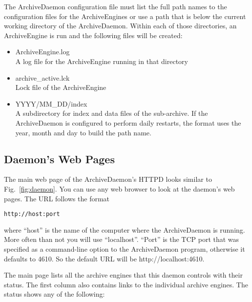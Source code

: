 \noindent The ArchiveDaemon configuration file must list the full path
names to the configuration files for the ArchiveEngines or use a path
that is below the current working directory of the ArchiveDaemon.
Within each of those directories, an ArchiveEngine is run and the
following files will be created:
\begin{itemize}
\item ArchiveEngine.log\\
  A log file for the ArchiveEngine running in that directory
\item archive\_active.lck\\
  Lock file of the ArchiveEngine
\item YYYY/MM\_DD/index \\
  A subdirectory for index and data files of the sub-archive.  If the
  ArchiveDaemon is configured to perform daily restarts, the format
  uses the year, month and day to build the path name.
\end{itemize}

\subsection{Daemon's Web Pages}
The main web page of the ArchiveDaemon's HTTPD looks similar to
Fig.~\ref{fig:daemon}. You can use any web browser to look at the
daemon's web pages. The URL follows the format
\begin{lstlisting}[keywordstyle=\sffamily]
    http://host:port
\end{lstlisting}
\noindent where ``host'' is the name of the computer where the
ArchiveDaemon is running. More often than not you will use
``localhost''. ``Port'' is the TCP port that was specified as a
command-line option to the ArchiveDaemon program, otherwise it
defaults to 4610. So the default URL will be http://localhost:4610.

The main page lists all the archive engines that this daemon controls
with their status. The first column also contains links to the
individual archive engines. The status shows any of the following:

